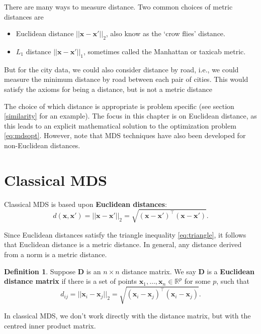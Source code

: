 \documentclass[]{book}
\providecommand{\tightlist}{%
  \setlength{\itemsep}{0pt}\setlength{\parskip}{0pt}}
\theoremstyle{definition}
\newtheorem{definition}{Definition}[chapter]
\theoremstyle{definition}
\theoremstyle{definition}
\theoremstyle{remark}
\begin{document}
There are many ways to measure distance. Two common choices of metric distances are

\begin{itemize}
\tightlist
\item
  Euclidean distance \(||\mathbf x-\mathbf x'||_2\), also know as the `crow flies' distance.
\item
  \(L_1\) distance \(||\mathbf x-\mathbf x'||_1\), sometimes called the Manhattan or taxicab metric.
\end{itemize}

But for the city data, we could also consider distance by road, i.e., we could measure the minimum distance by road between each pair of cities. This would satisfy the axioms for being a distance, but is not a metric distance

The choice of which distance is appropriate is problem specific (see section \ref{similarity} for an example). The focus in this chapter is on Euclidean distance, as this leads to an explicit mathematical solution to the optimization problem \eqref{eq:mdsopt}. However, note that MDS techniques have also been developed for non-Euclidean distances.

\hypertarget{classical-mds}{%
\section{Classical MDS}\label{classical-mds}}

Classical MDS is based upon \textbf{Euclidean distances}:
\[d(\mathbf x, \mathbf x') = ||\mathbf x-\mathbf x'||_2 = \sqrt{(\mathbf x-\mathbf x')^\top (\mathbf x-\mathbf x')}.\]

Since Euclidean distances satisfy the triangle
inequality \eqref{eq:triangle}, it follows that Euclidean distance is a metric distance. In general, any distance derived from a norm is a metric distance.

\begin{definition}
\protect\hypertarget{def:euclideanD}{}{\label{def:euclideanD} }Suppose \(\mathbf D\) is an \(n\times n\) distance matrix. We say \(\mathbf D\) is a \textbf{Euclidean distance matrix}
if there is a set of points \(\mathbf x_1,\ldots , \mathbf x_n \in \mathbb{R}^p\) for some \(p\), such that
\[
d_{ij}=\vert \vert \mathbf x_i -\mathbf x_j \vert \vert_2 =\sqrt{(\mathbf x_i-\mathbf x_j)^\top (\mathbf x_i-\mathbf x_j)}.
\]
\end{definition}

In classical MDS, we don't work directly with the distance matrix, but with the centred inner product matrix.
\end{document}
